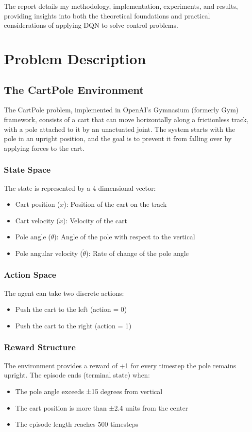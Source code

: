 \documentclass[11pt,a4paper]{article}
\begin{document}
The report details my methodology, implementation, experiments, and results, providing insights into both the theoretical foundations and practical considerations of applying DQN to solve control problems.

\section{Problem Description}

\subsection{The CartPole Environment}

The CartPole problem, implemented in OpenAI's Gymnasium (formerly Gym) framework, consists of a cart that can move horizontally along a frictionless track, with a pole attached to it by an unactuated joint. The system starts with the pole in an upright position, and the goal is to prevent it from falling over by applying forces to the cart.

\subsubsection{State Space}
The state is represented by a 4-dimensional vector:
\begin{itemize}
    \item Cart position ($x$): Position of the cart on the track
    \item Cart velocity ($\dot{x}$): Velocity of the cart
    \item Pole angle ($\theta$): Angle of the pole with respect to the vertical
    \item Pole angular velocity ($\dot{\theta}$): Rate of change of the pole angle
\end{itemize}

\subsubsection{Action Space}
The agent can take two discrete actions:
\begin{itemize}
    \item Push the cart to the left (action = 0)
    \item Push the cart to the right (action = 1)
\end{itemize}

\subsubsection{Reward Structure}
The environment provides a reward of +1 for every timestep the pole remains upright. The episode ends (terminal state) when:
\begin{itemize}
    \item The pole angle exceeds ±15 degrees from vertical
    \item The cart position is more than ±2.4 units from the center
    \item The episode length reaches 500 timesteps
\end{itemize}
\end{document}
